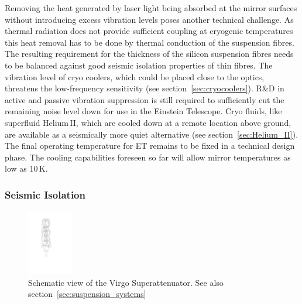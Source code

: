 Removing the heat generated by laser light being absorbed at the mirror surfaces 
without introducing excess vibration levels poses another technical challenge. As 
thermal radiation does not provide sufficient coupling at cryogenic temperatures 
this heat removal has to be done by thermal conduction of the suspension fibres. 
The resulting requirement for the thickness of the silicon suspension fibres needs 
to be balanced against good seismic isolation properties of thin fibres. The vibration 
level of cryo coolers, which could be placed close to the optics, threatens the 
low-frequency sensitivity (see section~\ref{sec:cryocoolers}). R\&D in active and 
passive vibration suppression is still required to sufficiently cut the remaining noise 
level down for use in the Einstein Telescope. Cryo fluids, like superfluid Helium\,II, 
which are cooled down at a remote location above ground, are available as a 
seismically more quiet alternative (see section~\ref{sec:Helium_II}). The final operating 
temperature for ET remains to be fixed in a technical design 
phase. The cooling capabilities foreseen so far will allow mirror temperatures 
as low as 10\,K.

\subsubsection{Seismic Isolation}

\begin{figure}
\vskip -0.4cm
	\centering
		\includegraphics[width=0.18\textwidth]{./Intro/Intro_Figures/VirgoSA.pdf}
\vskip 0.3cm
	\caption{Schematic view of the Virgo Superattenuator. See also section~\ref{sec:suspension_systems}}
\vskip -0.6cm
\end{figure} 

